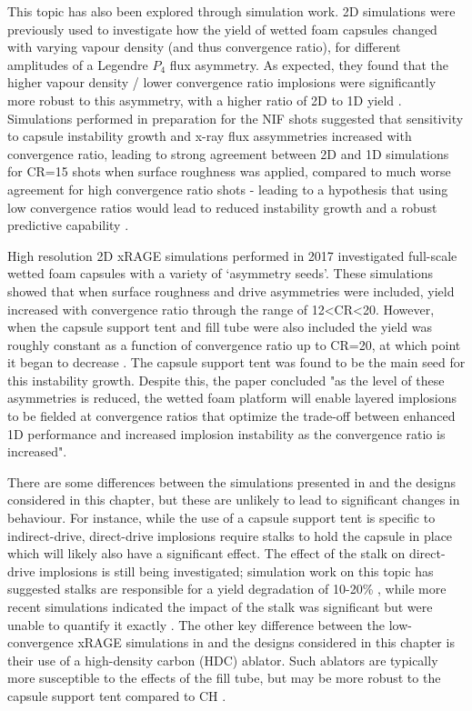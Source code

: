 This topic has also been explored through simulation work. 2D simulations were previously used to investigate how the yield of wetted foam capsules changed with varying vapour density (and thus convergence ratio), for different amplitudes of a Legendre $P_4$ flux asymmetry. As expected, they found that the higher vapour density / lower convergence ratio implosions were significantly more robust to this asymmetry, with a higher ratio of 2D to 1D yield \cite{Olson2013}. Simulations performed in preparation for the NIF shots suggested that sensitivity to capsule instability growth and x-ray flux assymmetries increased with convergence ratio, leading to strong agreement between 2D and 1D simulations for CR=15 shots when surface roughness was applied, compared to much worse agreement for high convergence ratio shots - leading to a hypothesis that using low convergence ratios would lead to reduced instability growth and a robust predictive capability \cite{Olson2016a}. 

High resolution 2D xRAGE simulations performed in 2017 investigated full-scale wetted foam capsules with a variety of `asymmetry seeds'. These simulations showed that when surface roughness and drive asymmetries were included, yield increased with convergence ratio through the range of 12<CR<20. However, when the capsule support tent and fill tube were also included the yield was roughly constant as a function of convergence ratio up to CR=20, at which point it began to decrease \cite{Haines2017a}. The capsule support tent was found to be the main seed for this instability growth. Despite this, the paper concluded "as the level of these asymmetries is reduced, the wetted foam platform will enable layered implosions to be fielded at convergence ratios that optimize the trade-off between enhanced 1D performance and increased implosion instability as the convergence ratio is increased".

There are some differences between the simulations presented in \cite{Haines2017a} and the designs considered in this chapter, but these are unlikely to lead to significant changes in behaviour. For instance, while the use of a capsule support tent is specific to indirect-drive, direct-drive implosions require stalks to hold the capsule in place which will likely also have a significant effect. The effect of the stalk on direct-drive implosions is still being investigated; simulation work on this topic has suggested stalks are responsible for a yield degradation of 10-20\% \cite{Shah2017}, while more recent simulations indicated the impact of the stalk was significant but were unable to quantify it exactly \cite{GatuJohnson2020}. The other key difference between the low-convergence xRAGE simulations in \cite{Haines2017a} and the designs considered in this chapter is their use of a high-density carbon (HDC) ablator. Such ablators are typically more susceptible to the effects of the fill tube, but may be more robust to the capsule support tent compared to CH \cite{Zylstra2022, Abu-Shawareb2022, Haines2019a, Clark2018}.

